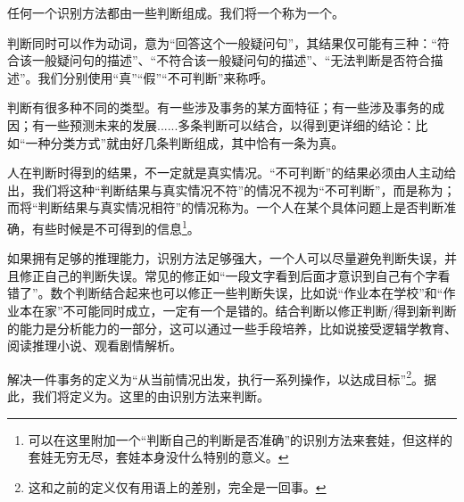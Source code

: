 任何一个识别方法都由一些判断组成。我们将一个称为一个。

判断同时可以作为动词，意为“回答这个一般疑问句”，其结果仅可能有三种：“符合该一般疑问句的描述”、“不符合该一般疑问句的描述”、“无法判断是否符合描述”。我们分别使用“真”“假”“不可判断”来称呼。
\begin{examples}
判断有很多种不同的类型。有一些涉及事务的某方面特征；有一些涉及事务的成因；有一些预测未来的发展......多条判断可以结合，以得到更详细的结论：比如“一种分类方式”就由好几条判断组成，其中恰有一条为真。
\end{examples}
人在判断时得到的结果，不一定就是真实情况。“不可判断”的结果必须由人主动给出，我们将这种“判断结果与真实情况不符”的情况不视为“不可判断”，而是称为；而将“判断结果与真实情况相符”的情况称为。一个人在某个具体问题上是否判断准确，有些时候是不可得到的信息\footnote{可以在这里附加一个“判断自己的判断是否准确”的识别方法来套娃，但这样的套娃无穷无尽，套娃本身没什么特别的意义。}。
\begin{explain}
如果拥有足够的推理能力，识别方法足够强大，一个人可以尽量避免判断失误，并且修正自己的判断失误。常见的修正如“一段文字看到后面才意识到自己有个字看错了”。数个判断结合起来也可以修正一些判断失误，比如说“作业本在学校”和“作业本在家”不可能同时成立，一定有一个是错的。结合判断以修正判断/得到新判断的能力是分析能力的一部分，这可以通过一些手段培养，比如说接受逻辑学教育、阅读推理小说、观看剧情解析。
\end{explain}
解决一件事务的定义为“从当前情况出发，执行一系列操作，以达成目标”\footnote{这和之前的定义仅有用语上的差别，完全是一回事。}。据此，我们将定义为。这里的由识别方法来判断。

